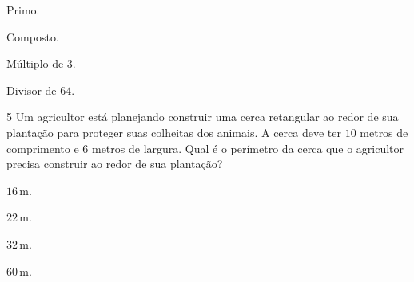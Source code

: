 \begin{escolha}
\item
  Primo.
\item
  Composto.
\item
  Múltiplo de $3$.
\item
  Divisor de $64$.
\end{escolha}




\num{5} Um agricultor está planejando construir uma cerca retangular ao redor
de sua plantação para proteger suas colheitas dos animais. A cerca deve ter
$10$ metros de comprimento e $6$ metros de largura. Qual é o perímetro da cerca
que o agricultor precisa construir ao redor de sua plantação?

\begin{escolha}
\item $16\,\text{m}$.
\item $22\,\text{m}$.
\item $32\,\text{m}$.
\item $60\,\text{m}$.
\end{escolha}


